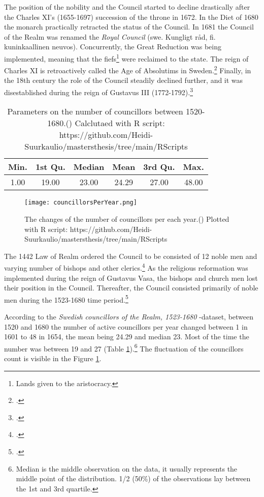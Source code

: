 The position of the nobility and the Council started to decline drastically after the Charles XI's (1655-1697) succession of the throne in 1672. In the Diet of 1680 the monarch practically retracted the status of the Council. In 1681 the Council of the Realm was renamed the \textit{Royal Council} (swe. Kungligt råd, fi. kuninkaallinen neuvos). Concurrently, the Great Reduction was being implemented, meaning that the fiefs\footnote{Lands given to the aristocracy.} were reclaimed to the state. The reign of Charles XI is retroactively called the Age of Absolutims in Sweden.\footcites[p. 289-295,]{pSuurvalta}[p. 8-9.]{personalAgency} Finally, in the 18th century the role of the Council steadily declined further, and it was disestablished during the reign of Gustavus III (1772-1792).\footcite[p. 14.]{hopesAndFearsIntro}

\begin{table}
	\caption{Parameters on the number of councillors between 1520-1680.(\cite{councillorsDS}) Calclutaed with R script: https://github.com/Heidi-Suurkaulio/mastersthesis/tree/main/RScripts}
	\label{tab:councillors}
	\centering
\begin{tabular}{c c c c c c}
	\hline
	Min. & 1st Qu. & Median & Mean & 3rd Qu. & Max.\\
	\hline
	1.00 & 19.00 & 23.00 & 24.29 & 27.00 & 48.00\\
	\hline
\end{tabular}
\end{table}

\begin{figure}[h]
	\texttt{[image: councillorsPerYear.png]}
	\centering
	\caption{The changes of the number of councillors per each year.(\cite{councillorsDS}) Plotted with R script: https://github.com/Heidi-Suurkaulio/mastersthesis/tree/main/RScripts} 
	\centering
	\label{fig:peryear}
\end{figure}

The 1442 Law of Realm ordered the Council to be consisted of 12 noble men and varying number of bishops and other clerics.\footcite[p. 49.]{HakanenAKoskinen2017} As the religious reformation was implemented during the reign of Gustavus Vasa, the bishops and church men lost their position in the Council. Thereafter, the Council consisted primarily of noble men during the 1523-1680 time period.\footcites[p. 72-75,]{pSuurvalta}[p. 15]{agencyAndStateBuilding} 

According to the \textit{Swedish councillors of the Realm, 1523-1680} -dataset, between 1520 and 1680 the number of active councillors per year changed between 1 in 1601 to 48 in 1654, the mean being 24.29 and median 23. Most of the time the number was between 19 and 27 (Table \ref{tab:councillors}).\footnote{Median is the middle observation on the data, it usually represents the middle point of the distribution.\cites[p. 26,]{statisticsfor}[p. 30-31.]{MooreEtAl} 1/2 (50\%) of the observations lay between the 1st and 3rd quartile.\cite[p. 32-33.]{MooreEtAl}} The fluctuation of the councillors count is visible in the Figure \ref{fig:peryear}. 

